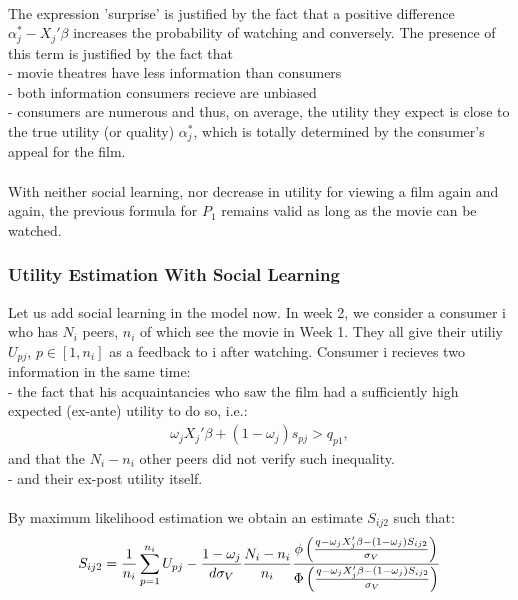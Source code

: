 	\\
	The expression 'surprise' is justified by the fact that a positive difference $\alpha_{j}^{*}-X_{j}'\beta$ increases the probability of watching and conversely. The presence of this term is justified by the fact that\\
	- movie theatres have less information than consumers\\
	- both information consumers recieve are unbiased\\
	- consumers are numerous and thus, on average, the utility they expect is close to the true utility (or quality) $\alpha_{j}^{*}$, which is totally determined by the consumer's appeal for the film.\\
	\\
	With neither social learning, nor decrease in utility for viewing a film again and again, the previous formula for $P_{1}$ remains valid as long as the movie can be watched.\\
	
	\subsubsection{Utility Estimation With Social Learning}	
	
	Let us add social learning in the model now. In week 2, we consider a consumer i who has $N_{i}$ peers, $n_{i}$ of which see the movie in Week 1. They all give their utiliy $U_{p j }$, $p\in[1,n_{i}]$ as a feedback to i after watching. Consumer i recieves two information in the same time:\\
	- the fact that his acquaintancies who saw the film had a sufficiently high expected (ex-ante) utility to do so, i.e.:
	\begin{align*}
	\omega_{j} X_{j}'\beta+(1-\omega_{j})s_{p j}>q_{p 1},
	\end{align*}
	and that the $N_{i}-n_{i}$ other peers did not verify such inequality.\\
	- and their ex-post utility itself.\\\\
	By maximum likelihood estimation we obtain an estimate $S_{i j 2}$ such that:
\begin{equation}
	S_{i j 2}=\frac{1}{n_{i}}\sum_{p=1}^{n_{i}}U_{p j}-\frac{1-\omega_{j}}{d\sigma_{V}}\frac{N_{i}-n_{i}}{n_{i}}\frac{\phi\left(\frac{q-\omega_{j}X'_{j}\beta-(1-\omega_{j})S_{i j 2}}{\sigma_{V}}\right)}{\Phi\left(\frac{q-\omega_{j}X'_{j}\beta-(1-\omega_{j})S_{i j 2}}{\sigma_{V}}\right)}\\
	\end{equation}
	
